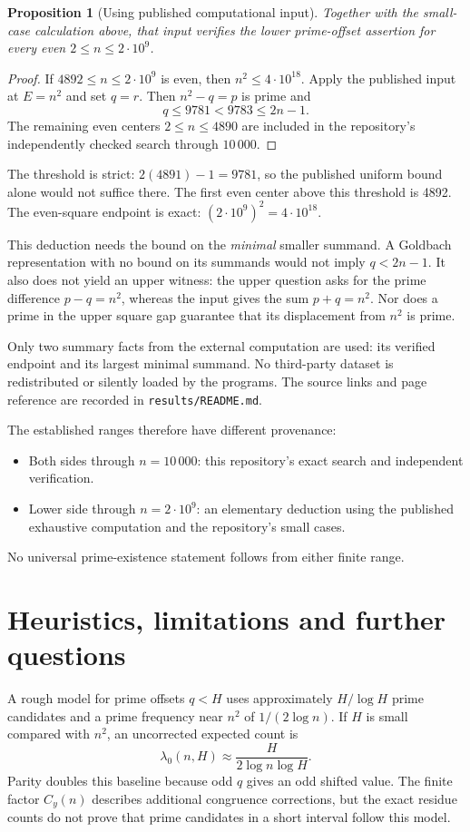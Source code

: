 \documentclass[11pt,a4paper]{article}
\newtheorem{proposition}{Proposition}
\begin{document}
\begin{proposition}[Using published computational input]\label{prop:goldbach}
Together with the small-case calculation above, that input verifies the
lower prime-offset assertion for every even $2\le n\le2\cdot10^9$.
\end{proposition}
\begin{proof}
If $4892\le n\le2\cdot10^9$ is even, then $n^2\le4\cdot10^{18}$.
Apply the published input at $E=n^2$ and set $q=r$. Then $n^2-q=p$
is prime and
\[
 q\le9781<9783\le2n-1.
\]
The remaining even centers $2\le n\le4890$ are included in the repository's
independently checked search through $10\,000$.
\end{proof}

The threshold is strict: $2(4891)-1=9781$, so the published uniform
bound alone would not suffice there. The first even center above this
threshold is 4892. The even-square endpoint is exact:
$(2\cdot10^9)^2=4\cdot10^{18}$.

This deduction needs the bound on the \emph{minimal} smaller summand.
A Goldbach representation with no bound on its summands would not imply
$q<2n-1$. It also does not yield an upper witness: the upper question asks
for the prime difference $p-q=n^2$, whereas the input gives the sum
$p+q=n^2$. Nor does a prime in the upper square gap guarantee that its
displacement from $n^2$ is prime.

Only two summary facts from the external computation are used: its verified
endpoint and its largest minimal summand. No third-party dataset is
redistributed or silently loaded by the programs. The source links and
page reference are recorded in \texttt{results/README.md}.

The established ranges therefore have different provenance:
\begin{itemize}
\item Both sides through $n=10\,000$: this repository's exact search and
independent verification.
\item Lower side through $n=2\cdot10^9$: an elementary deduction using the
published exhaustive computation and the repository's small cases.
\end{itemize}
No universal prime-existence statement follows from either finite range.

\newpage
\section{Heuristics, limitations and further questions}
A rough model for prime offsets $q<H$ uses approximately $H/\log H$
prime candidates and a prime frequency near $n^2$ of $1/(2\log n)$.
If $H$ is small compared with $n^2$, an uncorrected expected count is
\[
 \lambda_0(n,H)\approx\frac{H}{2\log n\log H}.
\]
Parity doubles this baseline because odd $q$ gives an odd shifted value.
The finite factor $C_y(n)$ describes additional congruence corrections,
but the exact residue counts do not prove that prime candidates in a short
interval follow this model.
\end{document}
